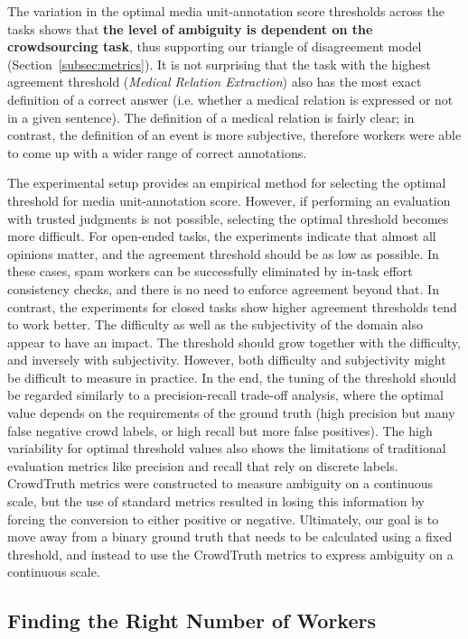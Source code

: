 {The variation in the optimal media unit-annotation score thresholds across the tasks shows that \textbf{the level of ambiguity is dependent on the crowdsourcing task}, thus supporting our triangle of disagreement model (Section~\ref{subsec:metrics}).  It is not surprising that the task with the highest agreement threshold (\textit{Medical Relation Extraction}) also has the most exact definition of a correct answer (i.e. whether a medical relation is expressed or not in a given sentence).  The definition of a medical relation is fairly clear; in contrast, the definition of an event is more subjective, therefore workers were able to come up with a wider range of correct annotations.

The experimental setup provides an empirical method for selecting the optimal threshold for media unit-annotation score.  However, if performing an evaluation with trusted judgments is not possible, selecting the optimal threshold becomes more difficult.  For open-ended tasks, the experiments indicate that almost all opinions matter, and the agreement threshold should be as low as possible.  In these cases, spam workers can be successfully eliminated by in-task effort consistency checks, and there is no need to enforce agreement beyond that.  In contrast, the experiments for closed tasks show higher agreement thresholds tend to work better.  The difficulty as well as the subjectivity of the domain also appear to have an impact.  The threshold should grow together with the difficulty, and inversely with subjectivity.  However, both difficulty and subjectivity might be difficult to measure in practice.  In the end, the tuning of the threshold should be regarded similarly to a precision-recall trade-off analysis, where the optimal value depends on the requirements of the ground truth (high precision but many false negative crowd labels, or high recall but more false positives).  The high variability for optimal threshold values also shows the limitations of traditional evaluation metrics like precision and recall that rely on discrete labels.  CrowdTruth metrics were constructed to measure ambiguity on a continuous scale, but the use of standard metrics resulted in losing this information by forcing the conversion to either positive or negative. Ultimately, our goal is to move away from a binary ground truth that needs to be calculated using a fixed threshold, and instead to use the CrowdTruth metrics to express ambiguity on a continuous scale.


\subsection{Finding the Right Number of Workers}


}
